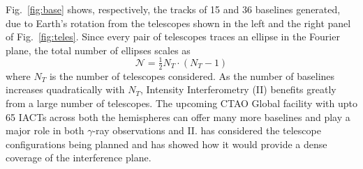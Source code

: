 Fig.~\ref{fig:base} shows, respectively, the tracks of 15 and 36 baselines generated, due to Earth's rotation from the telescopes shown in the left and the right panel of Fig.~\ref{fig:teles}. Since every pair of telescopes traces an ellipse in the Fourier plane, the total number of ellipses scales as
\begin{equation}
	\label{eq:N_telescopes}
	\mathcal{N} = \tfrac12 N_T \cdot (N_T -1)
\end{equation}
where $N_T$ is the number of telescopes considered.
As the number of baselines increases quadratically with $N_T$, Intensity Interferometry (II) benefits greatly from a large number of telescopes. The upcoming CTAO Global facility with upto 65 IACTs across both the hemispheres can offer many more baselines and play a major role in both $\gamma$-ray observations and II. \cite{2013APh....43..331D} has considered the telescope configurations being planned and has showed how it would provide a dense coverage of the interference plane.

